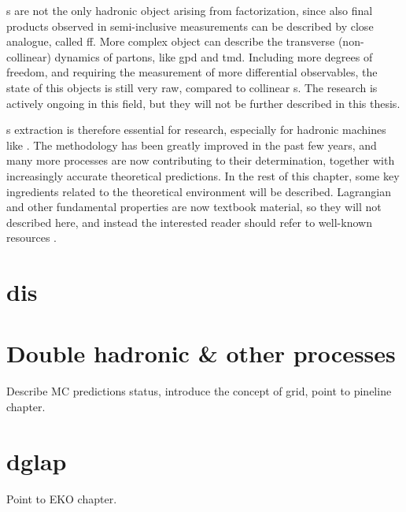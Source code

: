 \pdf{}s are not the only hadronic object arising from factorization, since also
final products observed in semi-inclusive measurements can be described by
close analogue, called \acrfull{ff}.
%
More complex object can describe the transverse (non-collinear) dynamics of
partons, like \acrfull{gpd} and \acrfull{tmd}.
Including more degrees of freedom, and requiring the measurement of more
differential observables, the state of this objects is still very raw, compared
to collinear \pdf{}s.
%
The research is actively ongoing in this field, but they will not be further
described in this thesis.

\pdf{}s extraction is therefore essential for \hep research, especially for
hadronic machines like \lhc.
The methodology has been greatly improved in the past few years, and many more
processes are now contributing to their determination, together with
increasingly accurate theoretical predictions.
%
In the rest of this chapter, some key ingredients related to the \pdf
theoretical environment will be described.
\qcd Lagrangian and other fundamental properties are now textbook material, so
they will not described here, and instead the interested reader should refer to
well-known resources
\cite{Peskin:1995ev,Ellis:1996mzs,Campbell:2017hsr,Collins:2011zzd}.


\section{\acrlong{dis}}
\label{sec:qcd/dis}


\section{Double hadronic \& other processes}
\label{sec:qcd/dy}


Describe MC predictions status, introduce the concept of grid, point to
pineline chapter.

\section{\acrlong{dglap}}
\label{sec:qcd/dglap}
% 

Point to EKO chapter.
